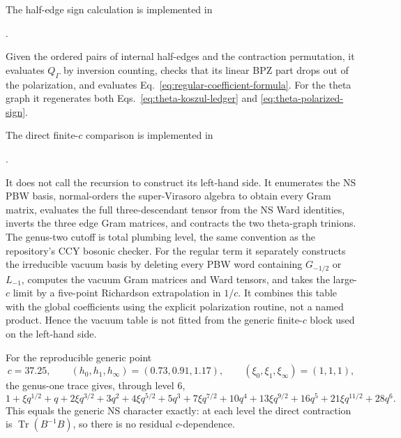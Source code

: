 \documentclass[11pt]{article}
\begin{document}
The half-edge sign calculation is implemented in
\begin{center}
 .
\end{center}
Given the ordered pairs of internal half-edges and the contraction
permutation, it evaluates \(Q_\Gamma\) by inversion counting, checks that its
linear BPZ part drops out of the polarization, and evaluates
Eq.~\eqref{eq:regular-coefficient-formula}.  For the theta graph it
regenerates both Eqs.~\eqref{eq:theta-koszul-ledger} and
\eqref{eq:theta-polarized-sign}.

The direct finite-\(c\) comparison is implemented in
\begin{center}
 .
\end{center}
It does not call the recursion to construct its left-hand side.  It
enumerates the NS PBW basis, normal-orders the super-Virasoro algebra to
obtain every Gram matrix, evaluates the full three-descendant tensor from
the NS Ward identities, inverts the three edge Gram matrices, and contracts
the two theta-graph trinions.  The genus-two cutoff is total plumbing level,
the same convention as the repository's CCY bosonic checker.
For the regular term it separately constructs the irreducible vacuum basis
by deleting every PBW word containing \(G_{-1/2}\) or \(L_{-1}\), computes
the vacuum Gram matrices and Ward tensors, and takes the large-\(c\) limit by
a five-point Richardson extrapolation in \(1/c\).  It combines this table
with the global coefficients using the explicit polarization routine, not a
named product.  Hence the vacuum table is not fitted from the generic
finite-\(c\) block used on the left-hand side.

For the reproducible generic point
\begin{equation}
 c=37.25,\qquad (h_0,h_1,h_\infty)=(0.73,0.91,1.17),
 \qquad (\xi_0,\xi_1,\xi_\infty)=(1,1,1),
 \label{eq:finite-c-benchmark-point}
\end{equation}
the genus-one trace gives, through level \(6\),
\begin{equation}
 1+\xi q^{1/2}+q+2\xi q^{3/2}+3q^2+4\xi q^{5/2}
 +5q^3+7\xi q^{7/2}+10q^4+13\xi q^{9/2}
 +16q^5+21\xi q^{11/2}+28q^6.
 \label{eq:genus-one-direct-level-four}
\end{equation}
This equals the generic NS character exactly: at each level the direct
contraction is \(\operatorname{Tr}(B^{-1}B)\), so there is no residual
\(c\)-dependence.
\end{document}
